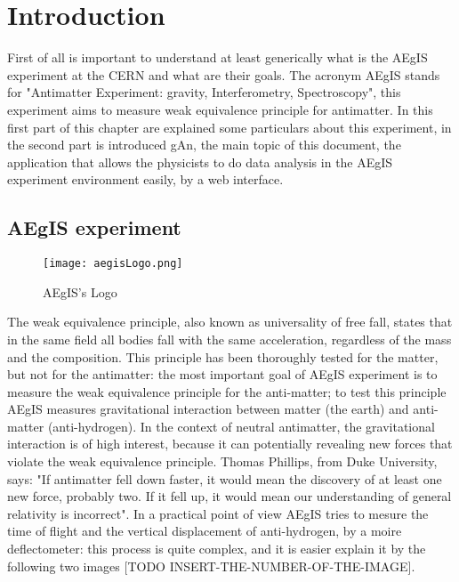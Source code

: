 
\chapter{Introduction} %

\label{Chapter1} %


First of all is important to understand at least generically what is the AEgIS experiment at the CERN and what are their goals. The acronym AEgIS stands for "Antimatter Experiment: gravity, Interferometry, Spectroscopy", this experiment aims to measure weak equivalence principle for antimatter. In this first part of this chapter are explained some particulars about this experiment, in the second part is introduced gAn, the main topic of this document, the application that allows the physicists to do data analysis in the AEgIS experiment environment easily, by a web interface. 

\section{AEgIS experiment}


\begin{figure}[H]
\centering
\texttt{[image: aegisLogo.png]} 
\caption{AEgIS's Logo}
\end{figure}

The weak equivalence principle, also known as universality of free fall, states that in the same field all bodies fall with the same acceleration, regardless of the mass and the composition. This principle has been thoroughly tested for the matter, but not for the antimatter: the most important goal of AEgIS experiment is to measure the weak equivalence principle for the anti-matter; to test this principle AEgIS measures gravitational interaction between matter (the earth) and anti-matter (anti-hydrogen). In the context of neutral antimatter, the gravitational interaction is of high interest, because it can potentially revealing new forces that violate the weak equivalence principle. Thomas Phillips, from Duke University, says: "If antimatter fell down faster, it would mean the discovery of at least one new force, probably two. If it fell up, it would mean our understanding of general relativity is incorrect". In a practical point of view AEgIS tries to mesure the time of flight and the vertical displacement of anti-hydrogen, by a moire deflectometer: this process is quite complex, and it is easier explain it by the following two images [TODO INSERT-THE-NUMBER-OF-THE-IMAGE].

